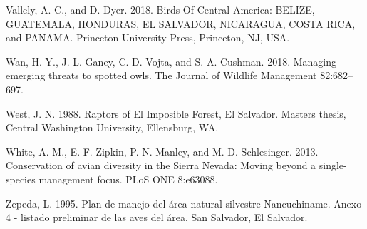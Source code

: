 \documentclass[
]{article}
\begin{document}
\leavevmode\hypertarget{ref-Vallely:2018}{}%
Vallely, A. C., and D. Dyer. 2018. Birds Of Central America: BELIZE,
GUATEMALA, HONDURAS, EL SALVADOR, NICARAGUA, COSTA RICA, and PANAMA.
Princeton University Press, Princeton, NJ, USA.

\leavevmode\hypertarget{ref-Wan:2018}{}%
Wan, H. Y., J. L. Ganey, C. D. Vojta, and S. A. Cushman. 2018. Managing
emerging threats to spotted owls. The Journal of Wildlife Management
82:682--697.

\leavevmode\hypertarget{ref-West:1988}{}%
West, J. N. 1988. Raptors of El Imposible Forest, El Salvador. Masters
thesis, Central Washington University, Ellensburg, WA.

\leavevmode\hypertarget{ref-White:2013}{}%
White, A. M., E. F. Zipkin, P. N. Manley, and M. D. Schlesinger. 2013.
Conservation of avian diversity in the Sierra Nevada: Moving beyond a
single-species management focus. PLoS ONE 8:e63088.

\leavevmode\hypertarget{ref-Zepeda:1995}{}%
Zepeda, L. 1995. Plan de manejo del área natural silvestre Nancuchiname.
Anexo 4 - listado preliminar de las aves del área, San Salvador, El
Salvador.
\end{document}
